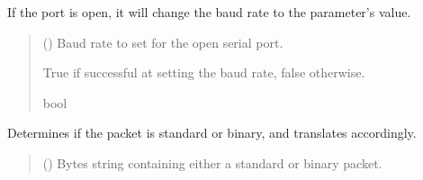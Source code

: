 \documentclass[letterpaper,10pt,english]{sphinxmanual}
\begin{document}
\begin{fulllineitems}

\begin{fulllineitems}
\label{\detokenize{BasicPodProtocol:BasicPodProtocol.POD_Basics.SetBaudrateOfDevice}}
\pysigstartsignatures
{}
\pysigstopsignatures
\sphinxAtStartPar
If the port is open, it will change the baud rate to the parameter’s value.
\begin{quote}\begin{description}
\sphinxAtStartPar
{} () \textendash{} Baud rate to set for the open serial port.

\sphinxAtStartPar
True if successful at setting the baud rate, false otherwise.

\sphinxAtStartPar
bool

\end{description}\end{quote}

\end{fulllineitems}


\begin{fulllineitems}
\label{\detokenize{BasicPodProtocol:BasicPodProtocol.POD_Basics.TranslatePODpacket}}
\pysigstartsignatures
{}
\pysigstopsignatures
\sphinxAtStartPar
Determines if the packet is standard or binary, and translates accordingly.
\begin{quote}\begin{description}
\sphinxAtStartPar
{} () \textendash{} Bytes string containing either a standard or binary packet.


\end{description}
\end{quote}
\end{fulllineitems}
\end{fulllineitems}
\end{document}
